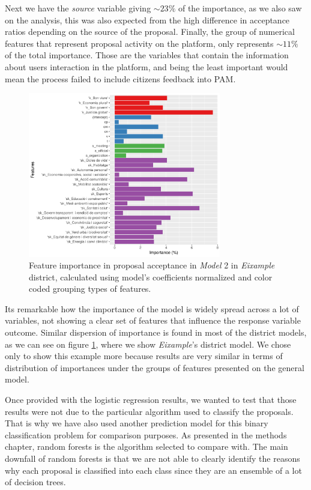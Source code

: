 Next we have the \emph{source} variable giving $\sim 23\%$ of the importance, as we also saw on the analysis, this was also expected from the high difference in acceptance ratios depending on the source of the proposal. Finally, the group of numerical features that represent proposal activity on the platform, only represents $\sim 11\%$ of the total importance. Those are the variables that contain the information about users interaction in the platform, and being the least important would mean the process failed to include citizens feedback into PAM.

\begin{figure}[t]
\centering
\includegraphics[width=0.75\textwidth]{Figures/importance_model2.pdf}
\caption{Feature importance in proposal acceptance in \emph{Model} 2 in \emph{Eixample} district, calculated using model's coefficients normalized and color coded grouping types of features.}
\label{importance_2}
\end{figure}

Its remarkable how the importance of the model is widely spread across a lot of variables, not showing a clear set of features that influence the response variable outcome. Similar dispersion of importance is found in most of the district models, as we can see on figure \ref{importance_2}, where we show \emph{Eixample}'s district model. We chose only to show this example more because results are very similar in terms of distribution of importances under the groups of features presented on the general model. 

Once provided with the logistic regression results, we wanted to test that those results were not due to the particular algorithm used to classify the proposals. That is why we have also used another prediction model for this binary classification problem for comparison purposes. As presented in the methods chapter, random forests is the algorithm selected to compare with. The main downfall of random forests is that we are not able to clearly identify the reasons why each proposal is classified into each class since they are an ensemble of a lot of decision trees.

